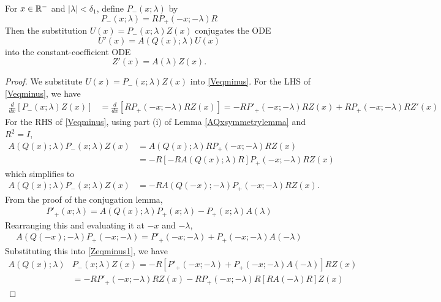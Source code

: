 \documentclass[thesis.tex]{subfiles}
\begin{document}
\begin{lemma}\label{conjRminuslemma}
For $x \in \mathbb{R}^-$ and $|\lambda| < \delta_1$, define $P_-(x; \lambda)$ by
\begin{equation}\label{defPminus}
P_-(x; \lambda) = RP_+(-x; -\lambda)R
\end{equation}
Then the substitution $U(x) = P_-(x; \lambda) Z(x)$ conjugates the ODE 
\begin{equation}\label{Veqminus}
U'(x) = A(Q(x); \lambda) U(x)
\end{equation}
into the constant-coefficient ODE 
\begin{equation}\label{Zeqminus}
Z'(x) = A(\lambda)Z(x).
\end{equation}
\begin{proof}
We substitute $U(x) = P_-(x; \lambda) Z(x)$ into \eqref{Veqminus}. For the LHS of \eqref{Veqminus}, we have
\begin{align}\label{PminusLHS}
\frac{d}{dx}[P_-(x; \lambda) Z(x)] &= \frac{d}{dx}[RP_+(-x; -\lambda)R Z(x)] = -RP'_+(-x; -\lambda)R Z(x) + RP_+(-x; -\lambda)R Z'(x)
\end{align}
For the RHS of \eqref{Veqminus}, using part (i) of Lemma \ref{AQxsymmetrylemma} and $R^2 = I$,
\begin{align*}
A(Q(x); \lambda)P_-(x; \lambda) Z(x) &= A(Q(x); \lambda)RP_+(-x; -\lambda)R Z(x) \\
&= -R[ -R A(Q(x); \lambda)R ]P_+(-x; -\lambda)R Z(x) 
\end{align*}
which simplifies to
\begin{align}\label{Zeqminus1}
A(Q(x); \lambda)P_-(x; \lambda) Z(x) &= -R A(Q(-x); -\lambda) P_+(-x; -\lambda)R Z(x). 
\end{align}
From the proof of the conjugation lemma,
\begin{align*}
P'_+(x; \lambda) = A(Q(x); \lambda)P_+(x; \lambda) - P_+(x; \lambda) A(\lambda)
\end{align*}
Rearranging this and evaluating it at $-x$ and $-\lambda$, 
\begin{align*}
 A(Q(-x); -\lambda)P_+(-x; -\lambda) = P'_+(-x; -\lambda) + P_+(-x; -\lambda) A(-\lambda)
\end{align*}
Substituting this into \eqref{Zeqminus1}, we have
\begin{align*}
A(Q(x); \lambda)&P_-(x; \lambda) Z(x) = -R [ P'_+(-x; -\lambda) + P_+(-x; -\lambda) A(-\lambda) ] R Z(x) \\
&= -R P'_+(-x; -\lambda) R Z(x) - R P_+(-x; -\lambda) R [ R A(-\lambda) R]Z(x)
\end{align*}

\end{proof}
\end{lemma}
\end{document}
